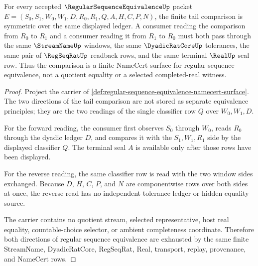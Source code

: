 \begin{theorem}
\label{thm:regular-sequence-equivalence-symmetric-tail-obligations}
For every accepted $\RegularSequenceEquivalenceUp$ packet $E=(S_0,S_1,W_0,W_1,D,R_0,R_1,Q,A,H,C,P,N)$, the finite tail comparison is symmetric over the same displayed ledger. A consumer reading the comparison from $R_0$ to $R_1$ and a consumer reading it from $R_1$ to $R_0$ must both pass through the same $\StreamNameUp$ windows, the same $\DyadicRatCoreUp$ tolerances, the same pair of $\RegSeqRatUp$ readback rows, and the same terminal $\RealUp$ seal row. Thus the comparison is a finite NameCert surface for regular sequence equivalence, not a quotient equality or a selected completed-real witness.
\end{theorem}
\begin{proof}
Project the carrier of \autoref{def:regular-sequence-equivalence-namecert-surface}. The two directions of the tail comparison are not stored as separate equivalence principles; they are the two readings of the single classifier row $Q$ over $W_0,W_1,D$.

For the forward reading, the consumer first observes $S_0$ through $W_0$, reads $R_0$ through the dyadic ledger $D$, and compares it with the $S_1,W_1,R_1$ side by the displayed classifier $Q$. The terminal seal $A$ is available only after those rows have been displayed.

For the reverse reading, the same classifier row is read with the two window sides exchanged. Because $D$, $H$, $C$, $P$, and $N$ are componentwise rows over both sides at once, the reverse read has no independent tolerance ledger or hidden equality source.

The carrier contains no quotient stream, selected representative, host real equality, countable-choice selector, or ambient completeness coordinate. Therefore both directions of regular sequence equivalence are exhausted by the same finite StreamName, DyadicRatCore, RegSeqRat, Real, transport, replay, provenance, and NameCert rows.
\end{proof}

